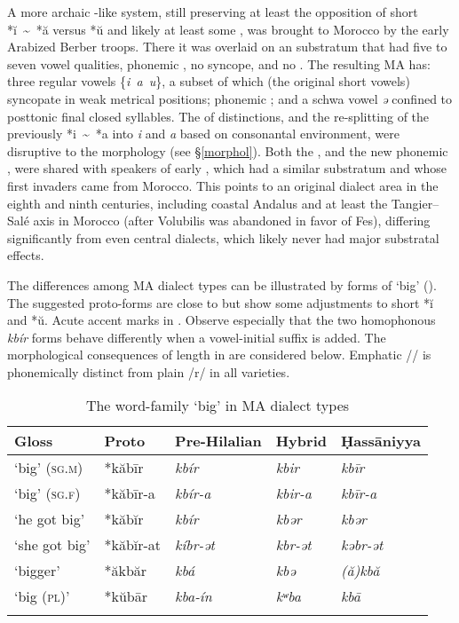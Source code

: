\documentclass[output=paper]{langsci/langscibook}
\begin{document}
A more archaic -like system, still preserving at least the opposition of short *ĭ~{\textasciitilde}~*ă versus *ŭ and likely at least some , was brought to Morocco by the early Arabized Berber troops. There it was overlaid on an  substratum that had five to seven vowel qualities, phonemic , no syncope, and no . The resulting  MA has: three regular vowels \{\textit{i~a~u}\}, a subset of which (the original short vowels) syncopate in weak metrical positions; phonemic ; and a schwa vowel \textit{ə} confined to posttonic final closed syllables. The  of  distinctions, and the re-splitting of the previously  *i~{\textasciitilde}~*a into \textit{i} and \textit{a} based on consonantal environment, were disruptive to the morphology (see §\ref{morphol}). Both the , and the new phonemic , were shared with speakers of early  , which had a similar  substratum and whose first invaders came from Morocco. This points to an original dialect area in the eighth and ninth centuries, including coastal Andalus and at least the Tangier–Salé axis in Morocco (after Volubilis was abandoned in favor of Fes), differing significantly from even  central  dialects, which likely never had major  substratal effects. 

The differences among MA dialect types can be illustrated by forms of ‘big’ (). The suggested proto-forms are close to  but show some adjustments to short *ĭ and *ŭ. Acute accent marks  in . Observe especially that the two homophonous  \textit{kbír} forms behave differently when a vowel-initial suffix is added. The morphological consequences of length  in  are considered below. Emphatic /{\R}/ is phonemically distinct from plain /r/ in all varieties. 

\begin{table}
\caption{\label{tab:heath:1}\label{bkm:Ref13483830}The word-family `big' in MA dialect types}
\begin{tabular}{*{5}{l}}
\lsptoprule
{Gloss} & {\normalfont Proto} & {\normalfont Pre-Hilalian} & {\normalfont Hybrid} & {\normalfont Ḥassāniyya}\\\midrule
‘big’ (\textsc{sg.m}) & *kăbīr & \textit{kbír} & \textit{kbir} & \textit{kbīr}\\
‘big’ (\textsc{sg.f}) & *kăbīr-a & \textit{kbír-a} & \textit{kbir-a} & \textit{kbīr-a}\\
‘he got big’ & *kăbĭr & \textit{kbír} & \textit{kbər} & \textit{kbər}\\
‘she got big’ & *kăbĭr-at & \textit{kíbr-ət} & \textit{kbr-ət} & \textit{kəbr-ət}\\
‘bigger’ & *ăkbăr & \textit{kbá{\R}} & \textit{kbə{\R}} & \textit{(ă)kbă{\R}}\\
‘big (\textsc{pl})’ & *kŭbār & \textit{kba{\R}-ín} & \textit{kʷba{\R}} & \textit{kbā{\R}}\\
\lspbottomrule
\end{tabular}
\end{table}
\end{document}
